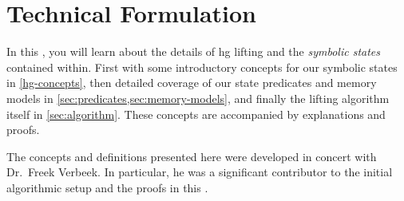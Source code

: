 \chapter{Technical Formulation}\label{ch:hg-formulation}
In this , you will learn about the details of \ac{hg} lifting and the \emph{symbolic states} contained within.
First with some introductory concepts for our symbolic states in \cref{hg-concepts},
then detailed coverage of our state predicates and memory models in \cref{sec:predicates,sec:memory-models},
and finally the lifting algorithm itself in \cref{sec:algorithm}.
These concepts are accompanied by explanations and proofs.

The concepts and definitions presented here were developed in concert with Dr.~Freek Verbeek.
In particular, he was a significant contributor to the initial algorithmic setup and the proofs in this .

